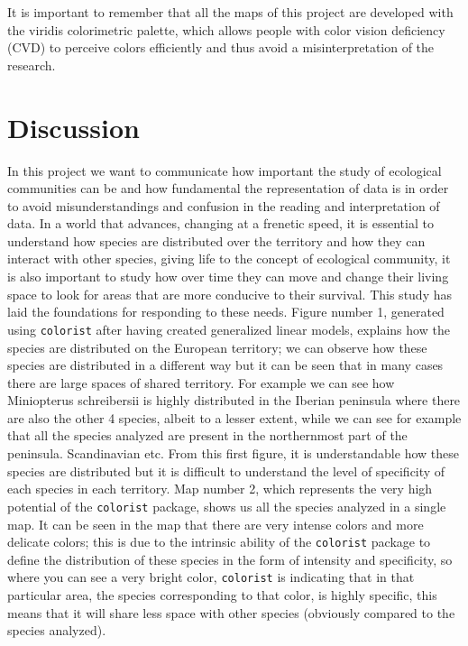 \documentclass[12pt,a4paper]{article}
\begin{document}
It is important to remember that all the maps of this project are developed with the viridis colorimetric palette, which allows people with color vision deficiency (CVD) to perceive colors efficiently and thus avoid a misinterpretation of the research.

\restoregeometry
\newpage
\section{Discussion}
In this project we want to communicate how important the study of ecological communities can be and how fundamental the representation of data is in order to avoid misunderstandings and confusion in the reading and interpretation of data.
In a world that advances, changing at a frenetic speed, it is essential to understand how species are distributed over the territory and how they can interact with other species, giving life to the concept of ecological community, it is also important to study how over time they can move and change their living space to look for areas that are more conducive to their survival.
This study has laid the foundations for responding to these needs.
Figure number 1, generated using \texttt{colorist} after having created generalized linear models, explains how the species are distributed on the European territory; we can observe how these species are distributed in a different way but it can be seen that in many cases there are large spaces of shared territory. For example we can see how Miniopterus schreibersii is highly distributed in the Iberian peninsula where there are also the other 4 species, albeit to a lesser extent, while we can see for example that all the species analyzed are present in the northernmost part of the peninsula. Scandinavian etc.
From this first figure, it is understandable how these species are distributed but it is difficult to understand the level of specificity of each species in each territory.
Map number 2, which represents the very high potential of the \texttt{colorist} package, shows us all the species analyzed in a single map. It can be seen in the map that there are very intense colors and more delicate colors; this is due to the intrinsic ability of the \texttt{colorist} package to define the distribution of these species in the form of intensity and specificity, so where you can see a very bright color, \texttt{colorist} is indicating that in that particular area, the species corresponding to that color, is highly specific, this means that it will share less space with other species (obviously compared to the species analyzed).
\end{document}
